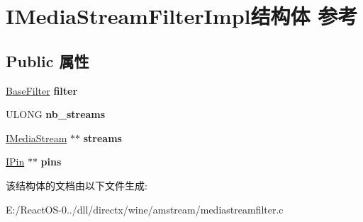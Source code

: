 \hypertarget{struct_i_media_stream_filter_impl}{}\section{I\+Media\+Stream\+Filter\+Impl结构体 参考}
\label{struct_i_media_stream_filter_impl}
\subsection*{Public 属性}
\begin{DoxyCompactItemize}
\item 
\mbox{\label{struct_i_media_stream_filter_impl_ad88eb90bd6072b03e36db8ca99830828}} 
\hyperlink{struct_base_filter}{Base\+Filter} {\bfseries filter}
\item 
\mbox{\label{struct_i_media_stream_filter_impl_a6bead7a7ba0ec968c08231b3351cbc4f}} 
U\+L\+O\+NG {\bfseries nb\+\_\+streams}
\item 
\mbox{\label{struct_i_media_stream_filter_impl_adb635fdc042270633bfd82a2400ec88b}} 
\hyperlink{interface_i_media_stream}{I\+Media\+Stream} $\ast$$\ast$ {\bfseries streams}
\item 
\mbox{\label{struct_i_media_stream_filter_impl_a5c724fdf17e781b353f86daca52f2c55}} 
\hyperlink{interface_i_pin}{I\+Pin} $\ast$$\ast$ {\bfseries pins}
\end{DoxyCompactItemize}


该结构体的文档由以下文件生成\+:\begin{DoxyCompactItemize}
\item 
E\+:/\+React\+O\+S-\/0../dll/directx/wine/amstream/mediastreamfilter.\+c\end{DoxyCompactItemize}
